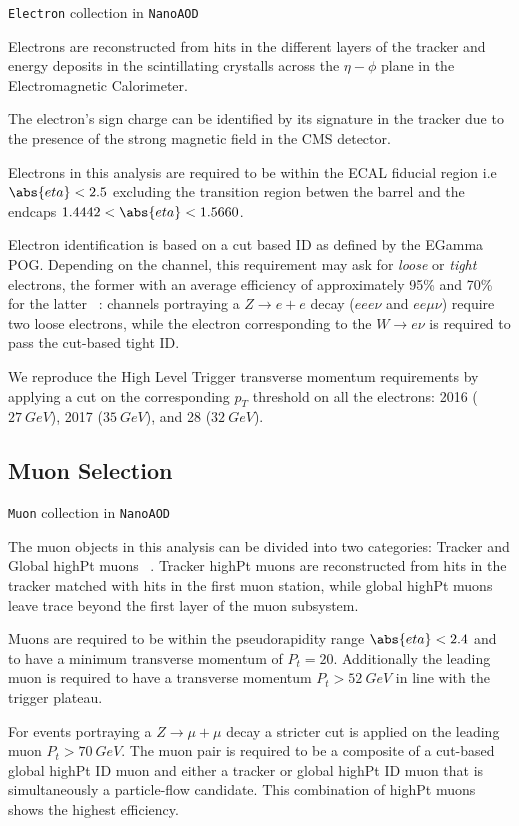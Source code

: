 \verb|Electron| collection in \verb|NanoAOD|

Electrons are reconstructed from hits in the different
layers of the tracker and energy deposits in the scintillating crystalls
across the $\eta-\phi$ plane in the Electromagnetic Calorimeter.

The electron's sign charge can be identified by its signature in the tracker
due to the presence of the strong magnetic field in the CMS detector.

Electrons in this analysis are required to be within the ECAL fiducial
region i.e $\abs{eta}<2.5$ excluding the transition region betwen the
barrel and the endcaps $1.4442<\abs{eta}<1.5660$.

Electron identification is based on a cut based ID as defined by the
EGamma POG. Depending on the channel, this requirement
may ask for \emph{loose} or \emph{tight} electrons, the former with an
average efficiency of approximately 95\% and 70\% for
the latter ~\cite{EGammaPOG_el}: channels portraying a $Z\rightarrow e+e$
decay ($eee\nu$ and $ee\mu\nu$) require two loose electrons, while the
electron corresponding to the $W\rightarrow e\nu$ is required to pass
the cut-based tight ID.

We reproduce the High Level Trigger transverse momentum requirements by
applying a cut on the corresponding $p_T$ threshold on all the electrons:
2016 ($27~GeV$), 2017 ($35~GeV$), and 28 ($32~GeV$).

\subsection{Muon Selection}

\verb|Muon| collection in \verb|NanoAOD|

The muon objects in this analysis can be divided into two categories:
Tracker and Global highPt muons ~\cite{MuonPOG}. Tracker highPt muons are
reconstructed from hits in the tracker matched with hits in the first
muon station, while global highPt muons leave trace beyond the first
layer of the muon subsystem.

Muons are required to be within the pseudorapidity range $\abs{eta}<2.4$ and
to have a minimum transverse momentum of $P_t=20$. Additionally the leading muon
is required to have a transverse momentum $P_t>52~GeV$ in line with
the trigger plateau.

For events portraying a $Z\rightarrow\mu+\mu$ decay a stricter cut is applied on the
leading muon $P_{t}>70~GeV$. The muon pair is required to be a composite of a
cut-based global highPt ID muon and either a tracker or global highPt ID muon
that is simultaneously a particle-flow candidate. This combination of highPt
muons shows the highest efficiency. %

